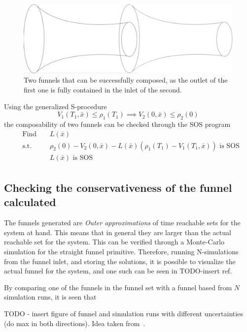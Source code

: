 \begin{figure}
  \includegraphics[scale=.2]{figures/method/funnel-composition} \centering
  \caption{Two funnels that can be successfully composed, as the outlet of the
    first one is fully contained in the inlet of the second.}
  \label{fig:two-funnels-composed}
\end{figure}

Using the generalized S-procedure
\begin{equation}
  V_1(T_1,\bar{x}) \leq \rho_1(T_1) \implies V_2(0, \bar{x}) \leq \rho_2(0)
\end{equation}
the composability of two funnels can be checked through the \ac{SOS} program
\begin{align*}
    & \text{Find } && L(\bar{x}) \\
    & \text{s.t. } && \rho_2(0) - V_2(0,\bar{x}) - L(\bar{x})\left( \rho_1(T_1) - V_1(T_1,\bar{x}) \right) \text{ is SOS} \\
    &&& L(\bar{x}) \text{ is SOS} \\
\end{align*}

\subsection{Checking the conservativeness of the funnel calculated}

The funnels generated are \textit{Outer approximations} of time reachable sets
for the system at hand. This means that in general they are larger than the
actual reachable set for the system. This can be verified through a Monte-Carlo
simulation for the straight funnel primitive. Therefore, running N-simulations
from the funnel inlet, and storing the solutions, it is possible to visualize
the actual funnel for the system, and one such can be seen in TODO-insert ref.

By comparing one of the funnels in the funnel set with a funnel based from \(N\)
simulation runs, it is seen that

TODO - insert figure of funnel and simulation runs with different uncertainties
(do max in both directions).
Idea taken from~\cite{mooreControlSynthesisVerification2012}.

